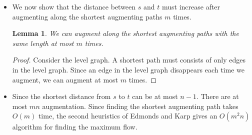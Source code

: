 \documentclass[10pt]{article}
\newtheorem{lemma}{Lemma}[section]
\begin{document}
\begin{itemize}
        \begin{proof} (Lemma~\ref{augmenting-path-no-shorter})
          Let $p$ be the shortest augmenting path. Note
          that all edges of $p$ are present in the level graph.
          Consider the residual graph after augmenting along $p$.
          We have that one edge of the level graph will not
          appear in the residual graphs. Moreover, there may 
          be at most new $|p|$ edges appearing in the residual graph,
          but they all point backwards in the level graph.
          Hence, these new edges cannot make the sink closer
          to the source. Therefore, the shortest path from 
          sink to source cannot be shorter than the one in 
          the original graph.
        \end{proof}
        
      \item We now show that the distance between $s$ and $t$
        must increase after augmenting along the shortest
        augmenting paths $m$ times.
        
        \begin{lemma}
          We can augment along the shortest augmenting paths
          with the same length at most $m$ times.
        \end{lemma}
        
        \begin{proof}
          Consider the level graph. A shortest path must consists
          of only edges in the level graph. Since an edge in
          the level graph disappears each time we augment,
          we can augment at most $m$ times.
        \end{proof}
        
      \item Since the shortest distance from $s$ to $t$ can
        be at most $n-1$. There are at most $mn$ augmentation.
        Since finding the shortest augmenting path takes $O(m)$
        time, the second heuristics of Edmonds and Karp gives
        an $O(m^2n)$ algorithm for finding the maximum flow.

    \end{itemize}
    
\end{document}
